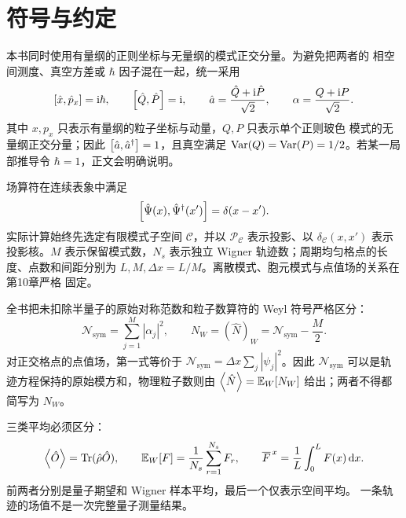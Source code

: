 \chapter*{符号与约定}

本书同时使用有量纲的正则坐标与无量纲的模式正交分量。为避免把两者的
相空间测度、真空方差或 $\hbar$ 因子混在一起，统一采用
\begin{equation*}
  \left[\hat x,\hat p_x\right]=\mathrm{i}\hbar,
  \qquad
  \left[\hat Q,\hat P\right]=\mathrm{i},
  \qquad
  \hat a=\frac{\hat Q+\mathrm{i}\hat P}{\sqrt2},
  \qquad
  \alpha=\frac{Q+\mathrm{i} P}{\sqrt2}.
\end{equation*}
其中 $x,p_x$ 只表示有量纲的粒子坐标与动量，$Q,P$ 只表示单个正则玻色
模式的无量纲正交分量；因此 $\left[\hat a,\hat a^{\dagger}\right]=1$，且真空满足
$\operatorname{Var}(Q)=\operatorname{Var}(P)=1/2$。若某一局部推导令 $\hbar=1$，正文会明确说明。

场算符在连续表象中满足
\begin{equation*}
  \left[\hat{\Psi}(x),\hat{\Psi}^{\dagger}(x')\right]=\delta(x-x').
\end{equation*}
实际计算始终先选定有限模式子空间 $\mathcal C$，并以
$\mathcal P_{\mathcal C}$ 表示投影、以
$\delta_{\mathcal C}(x,x')$ 表示投影核。$M$ 表示保留模式数，$N_s$
表示独立 Wigner 轨迹数；周期均匀格点的长度、点数和间距分别为
$L,M,\Delta x=L/M$。离散模式、胞元模式与点值场的关系在第10章严格
固定。

全书把未扣除半量子的原始对称范数和粒子数算符的 Weyl 符号严格区分：
\begin{equation*}
  \mathcal N_{\mathrm{sym}}=\sum_{j=1}^{M}|\alpha_j|^2,
  \qquad
  N_W=(\hat N)_W=\mathcal N_{\mathrm{sym}}-\frac M2.
\end{equation*}
对正交格点的点值场，第一式等价于
$\mathcal N_{\mathrm{sym}}=\Delta x\sum_j|\psi_j|^2$。因此
$\mathcal N_{\mathrm{sym}}$ 可以是轨迹方程保持的原始模方和，物理粒子数则由
$\left\langle \hat N\right\rangle=\mathbb{E}_{W}\!\left[N_W\right]$ 给出；两者不得都简写为 $N_W$。

三类平均必须区分：
\begin{equation*}
  \left\langle \hat O\right\rangle=\operatorname{Tr}(\hat\rho\hat O),
  \qquad
  \mathbb{E}_{W}\!\left[F\right]=\frac1{N_s}\sum_{r=1}^{N_s}F_r,
  \qquad
  \overline{F}^{\,x}=\frac1L\int_0^L F(x)\mathop{}\!\mathrm{d} x .
\end{equation*}
前两者分别是量子期望和 Wigner 样本平均，最后一个仅表示空间平均。
一条轨迹的场值不是一次完整量子测量结果。

